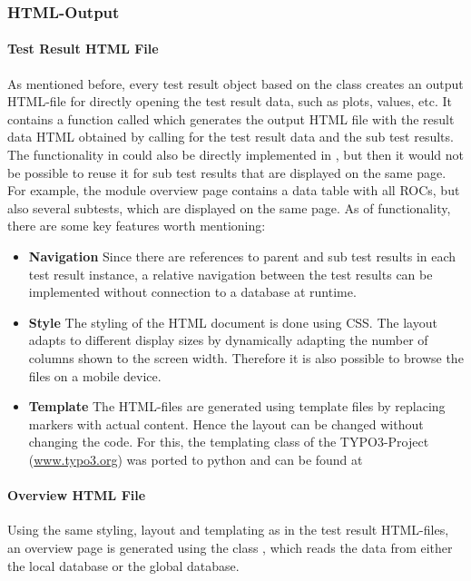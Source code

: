 \documentclass[0_Bericht]{subfiles}
\begin{document}
			\subsubsection{HTML-Output}
				\label{sec:HTML-Output}
				\paragraph{Test Result HTML File}
					As mentioned before, every test result object based on the class  creates an output HTML-file for directly opening the test result data, such as plots, values, etc. 
					It contains a function called  which generates the output HTML file with the result data HTML obtained by calling  for the test result data and the sub test results. The functionality in  could also be directly implemented in , but then it would not be possible to reuse it for sub test results that are displayed on the same page. For example, the module overview page contains a data table with all ROCs, but also several subtests, which are displayed on the same page. 
					As of functionality, there are some key features worth mentioning:
					\begin{itemize}
						\item \textbf{Navigation} Since there are references to parent and sub test results in each test result instance, a relative navigation between the test results can be implemented without connection to a database at runtime. 
						\item \textbf{Style} The styling of the HTML document is done using CSS. The layout adapts to different display sizes by dynamically adapting the number of columns shown to the screen width. Therefore it is also possible to browse the files on a mobile device.
						\item \textbf{Template} The HTML-files are generated using template files by replacing markers with actual content. Hence the layout can be changed without changing the code. For this, the templating class of the TYPO3-Project (\url{www.typo3.org}) was ported to python and can be found at 
					\end{itemize}
				\paragraph{Overview HTML File}
					Using the same styling, layout and templating as in the test result HTML-files, an overview page is generated using the class , which reads the data from either the local database or the global database.
\end{document}
